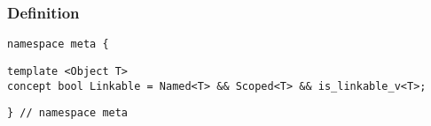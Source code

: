 
\subsubsection{Definition}

\begin{verbatim}
namespace meta {
\end{verbatim}
\begin{verbatim}
template <Object T>
concept bool Linkable = Named<T> && Scoped<T> && is_linkable_v<T>;

\end{verbatim}
\begin{verbatim}
} // namespace meta
\end{verbatim}
